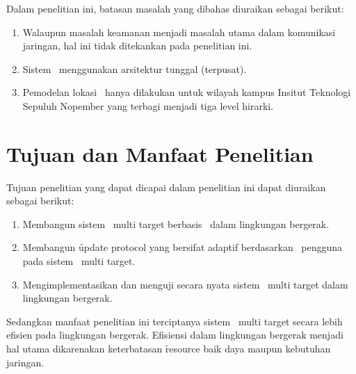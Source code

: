 Dalam penelitian ini, batasan masalah yang dibahas diuraikan sebagai berikut:
\begin{enumerate}
    \item Walaupun masalah keamanan menjadi masalah utama dalam
        komunikasi jaringan, hal ini tidak ditekankan pada penelitian ini.
    \item Sistem \PubSub~menggunakan arsitektur tunggal (terpusat).
    \item Pemodelan lokasi \tracking~hanya dilakukan untuk wilayah kampus Insitut
        Teknologi Sepuluh Nopember yang terbagi menjadi tiga level hirarki.
\end{enumerate}

\section{Tujuan dan Manfaat Penelitian}

Tujuan penelitian yang dapat dicapai dalam penelitian ini dapat diuraikan sebagai
berikut:
\begin{enumerate}
  \item Membangun sistem \tracking~multi target berbasis \pubsub~dalam lingkungan
    bergerak.
  \item Membangun \f{update protocol} yang bersifat adaptif berdasarkan
    \context~pengguna pada sistem \tracking~multi target.
  \item Mengimplementasikan dan menguji secara nyata sistem \tracking~multi
    target dalam lingkungan bergerak.
\end{enumerate}



Sedangkan manfaat penelitian ini terciptanya sistem \tracking~multi target
secara lebih efisien pada lingkungan bergerak. Efisiensi dalam lingkungan
bergerak menjadi hal utama dikarenakan keterbatasan \f{resource} baik daya
maupun kebutuhan jaringan.

